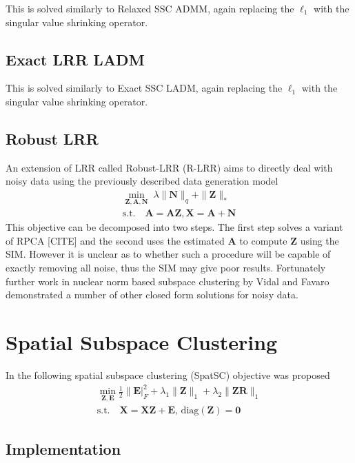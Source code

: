 \documentclass{article}
\begin{document}
This is solved similarly to Relaxed SSC ADMM, again replacing the $\ell_1$ with the singular value shrinking operator.

\subsection{Exact LRR LADM}

This is solved similarly to Exact SSC LADM, again replacing the $\ell_1$ with the singular value shrinking operator.

\subsection{Robust LRR}

An extension of LRR called Robust-LRR (R-LRR) aims to directly deal with noisy data using the previously described data generation model
\begin{align}
\min_{\mathbf {Z, A, N}} \; \lambda \|\mathbf{N}\|_{q} + \|\mathbf Z\|_{*} \\
\text{s.t.} \quad \mathbf{A = AZ, X = A + N} \nonumber
\end{align}
This objective can be decomposed into two steps. The first step solves a variant of RPCA [CITE] and the second uses the estimated $\mathbf A$ to compute $\mathbf Z$ using the SIM. However it is unclear as to whether such a procedure will be capable of exactly removing all noise, thus the SIM may give poor results. Fortunately further work in nuclear norm based subspace clustering by Vidal and Favaro \cite{Vidal201447} demonstrated a number of other closed form solutions for noisy data.

\newpage
\section{Spatial Subspace Clustering}

In \cite{Guo.Y;Gao.J;Li.F-2013} the following spatial subspace clustering (SpatSC) objective was proposed
\begin{align}
\label{YiGuo1}
\min_{\mathbf Z, \mathbf E} \frac12\|\mathbf E|^2_F +\lambda_1\|\mathbf Z\|_{1}+\lambda_2\|\mathbf Z\mathbf R\|_{1} \\
\text{s.t.} \quad \mathbf{X = XZ + E}\text{, diag}(\mathbf Z) = \mathbf 0 \nonumber
\end{align}

\subsection{Implementation}
\end{document}
